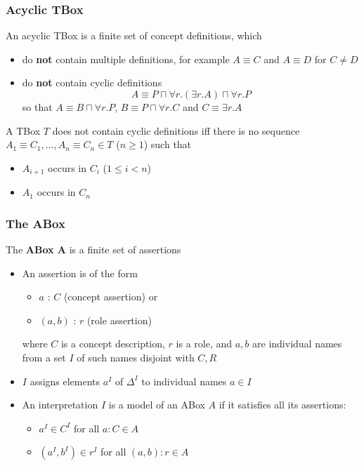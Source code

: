 \documentclass[conference]{styles/acmsiggraph}
\begin{document}
        \subsubsection{Acyclic TBox}
            An acyclic TBox is a finite set of concept definitions, which
            \begin{itemize}
                \item do \textbf{not} contain multiple definitions, for example $A \equiv C$ and $A \equiv D$ for $C \neq D$
                \item do \textbf{not} contain cyclic definitions
                    $$A \equiv P \sqcap \forall r.(\exists r.A) \sqcap \forall r.P$$
                    so that $A \equiv B \sqcap \forall r.P$, $B \equiv P \sqcap \forall r.C$ and $C \equiv \exists r.A$
            \end{itemize}
            A TBox $T$ does not contain cyclic definitions iff there is no sequence $A_1 \equiv C_1,...,A_n \equiv C_n \in T$ ($n \geq 1$) such that 
                \begin{itemize}
                    \item $A_{i+1}$ occurs in $C_i$ ($1 \leq i < n$)
                    \item $A_1$ occurs in $C_n$
                \end{itemize}
    
\newpage
    
        \subsubsection{The ABox}
            The \textbf{ABox A} is a finite set of assertions
            \begin{itemize}
                \item An assertion is of the form
                    \begin{itemize}
                        \item $a$ : $C$ (concept assertion) or
                        \item $(a,b)$ : $r$ (role assertion)
                    \end{itemize}
                    where $C$ is a concept description, $r$ is a role, and $a,b$ are individual names from a set $I$ of such names disjoint with $C,R$
                \item $I$ assigns elements $a^I$ of $\Delta^I$ to individual names $a \in I$
                \item An interpretation $I$ is a model of an ABox $A$ if it satisfies all its assertions:
                    \begin{itemize}
                        \item $a^I \in C^I$ for all $a : C \in A$
                        \item $(a^I,b^I) \in r^I$ for all $(a,b) : r \in A$
                    \end{itemize}
            \end{itemize}
        
\end{document}
